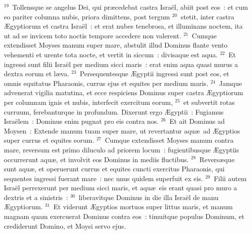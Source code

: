 ${}^{19}$~Tollensque se angelus Dei, qui pr\ae cedebat castra Isra\"el, abiit post eos~: et cum eo pariter columna nubis, priora dimittens, post tergum
${}^{20}$~stetit, inter castra \AE gyptiorum et castra Isra\"el~: et erat nubes tenebrosa, et illuminans noctem, ita ut ad se invicem toto noctis tempore accedere non valerent.
${}^{21}$~Cumque extendisset Moyses manum super mare, abstulit illud Dominus flante vento vehementi et urente tota nocte, et vertit in siccum~: divisaque est aqua.
${}^{22}$~Et ingressi sunt filii Isra\"el per medium sicci maris~: erat enim aqua quasi murus a dextra eorum et l\ae va.
${}^{23}$~Persequentesque \AE gyptii ingressi sunt post eos, et omnis equitatus Pharaonis, currus ejus et equites per medium maris.
${}^{24}$~Jamque advenerat vigilia matutina, et ecce respiciens Dominus super castra \AE gyptiorum per columnam ignis et nubis, interfecit exercitum eorum,
${}^{25}$~et subvertit rotas curruum, ferebanturque in profundum. Dixerunt ergo \AE gyptii~: Fugiamus Isra\"elem~: Dominus enim pugnat pro eis contra nos.
${}^{26}$~Et ait Dominus ad Moysen~: Extende manum tuam super mare, ut revertantur aqu\ae\ ad \AE gyptios super currus et equites eorum.
${}^{27}$~Cumque extendisset Moyses manum contra mare, reversum est primo diluculo ad priorem locum~: fugientibusque \AE gyptiis occurrerunt aqu\ae , et involvit eos Dominus in mediis fluctibus.
${}^{28}$~Revers\ae que sunt aqu\ae , et operuerunt currus et equites cuncti exercitus Pharaonis, qui sequentes ingressi fuerant mare~: nec unus quidem superfuit ex eis.
${}^{29}$~Filii autem Isra\"el perrexerunt per medium sicci maris, et aqu\ae\ eis erant quasi pro muro a dextris et a sinistris~:
${}^{30}$~liberavitque Dominus in die illa Isra\"el de manu \AE gyptiorum.
${}^{31}$~Et viderunt \AE gyptios mortuos super littus maris, et manum magnam quam exercuerat Dominus contra eos~: timuitque populus Dominum, et crediderunt Domino, et Moysi servo ejus.

